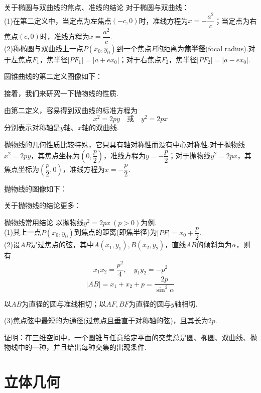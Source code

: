 \documentclass[lang=cn, zihao=5]{elegantbook}
\newcommand{\ssb}[1]{\left( #1 \right)}
\begin{document}
\begin{proposition}{关于椭圆与双曲线的焦点、准线的结论}
	对于椭圆与双曲线： \\
	(1)在第二定义中，当定点为左焦点$(-c,0)$时，准线方程为$x=-\dfrac{a^2}{c}$；当定点为右焦点$(c,0)$时，准线方程为$x=\dfrac{a^2}{c}$. \\
	(2)称椭圆与双曲线上一点$P(x_0,y_0)$到一个焦点$F$的距离为\textbf{焦半径}(focal radius).对于左焦点$F_1$，焦半径$|PF_1|=|a+ex_0|$；对于右焦点$F_2$，焦半径$|PF_2|=|a-ex_0|$.
\end{proposition}

圆锥曲线的第二定义图像如下：


接着，我们来研究一下抛物线的性质.

由第二定义，容易得到双曲线的标准方程为$$x^2=2py \quad \textit{或} \quad y^2=2px$$
分别表示对称轴是$y$轴、$x$轴的双曲线.

抛物线的几何性质比较特殊，它只具有轴对称性而没有中心对称性.对于抛物线$x^2=2py$，其焦点坐标为$\ssb{0,\dfrac{p}{2}}$，准线方程为$y=-\dfrac{p}{2}$；对于抛物线$y^2=2px$，其焦点坐标为$\ssb{\dfrac{p}{2},0}$，准线方程为$x=-\dfrac{p}{2}$.

抛物线的图像如下：


关于抛物线的结论更多：

\begin{proposition}{抛物线常用结论}
	以抛物线$y^2=2px~(p>0)$为例. \\
	(1)其上一点$P(x_0,y_0)$到焦点的距离(即焦半径)为$|PF|=x_0+\dfrac{p}{2}$. \\
	(2)设$AB$是过焦点的弦，其中$A(x_1,y_1),B(x_2,y_2)$，直线$AB$的倾斜角为$\alpha $，则有
	$$x_1x_2=\frac{p^2}{4},\quad y_1y_2=-p^2$$
	$$|AB| = x_1+x_2+p=\frac{2p}{\sin ^2 \alpha }$$
	\begin{center}
		以$AB$为直径的圆与准线相切；以$AF,BF$为直径的圆与$y$轴相切.
	\end{center}
	(3)焦点弦中最短的为通径(过焦点且垂直于对称轴的弦)，且其长为$2p$.
\end{proposition}

\begin{problem}
	证明：在三维空间中，一个圆锥与任意给定平面的交集总是圆、椭圆、双曲线、抛物线中的一种，并且给出每种交集的出现条件.
\end{problem}


\chapter{立体几何}
\end{document}
